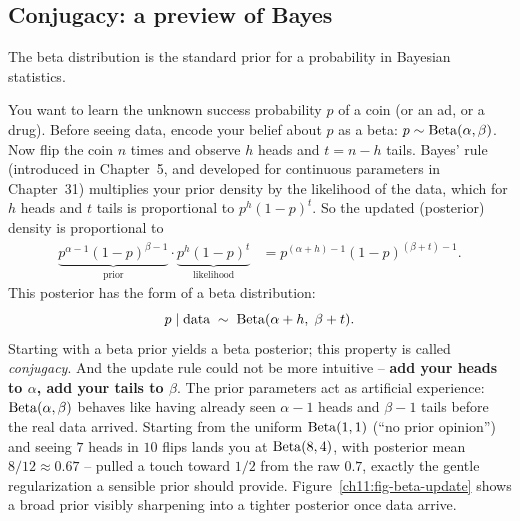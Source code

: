 \subsection{Conjugacy: a preview of Bayes}
\label{ch11:conjugacy}
The beta distribution is the standard prior for a probability in Bayesian statistics.
\begin{applicationbox}
You want to learn the unknown success probability $p$ of a coin (or an ad, or a
drug). Before seeing data, encode your belief about $p$ as a beta:
$p \sim \operatorname{Beta}(\alpha,\beta)$. Now flip the coin $n$ times and observe $h$ heads
and $t = n-h$ tails. Bayes' rule (introduced in Chapter~5, and developed for
continuous parameters in Chapter~31) multiplies your prior
density by the likelihood of the data, which for $h$ heads and $t$ tails is
proportional to $p^{h}(1-p)^{t}$. So the updated (posterior) density is
proportional to
\begin{align*}
  \underbrace{p^{\alpha-1}(1-p)^{\beta-1}}_{\text{prior}} \cdot \underbrace{p^{h}(1-p)^{t}}_{\text{likelihood}} &= p^{(\alpha+h)-1}(1-p)^{(\beta+t)-1}.
\end{align*}
This posterior has the form of a beta distribution:
\[
  p \mid \text{data} \;\sim\; \operatorname{Beta}(\alpha + h,\; \beta + t).
\]
Starting with a beta prior yields a beta posterior; this property is called \emph{conjugacy}. And the update rule
could not be more intuitive -- \textbf{add your heads to $\alpha$, add your tails
to $\beta$}. The prior parameters act as artificial experience: $\operatorname{Beta}(\alpha,
\beta)$ behaves like having already seen $\alpha-1$ heads and $\beta-1$ tails
before the real data arrived. Starting from the uniform $\operatorname{Beta}(1,1)$ (``no prior
opinion'') and seeing $7$ heads in $10$ flips lands you at $\operatorname{Beta}(8,4)$, with
posterior mean $8/12 \approx 0.67$ -- pulled a touch toward $1/2$ from the raw
$0.7$, exactly the gentle regularization a sensible prior should provide.
Figure~\ref{ch11:fig-beta-update} shows a broad prior visibly sharpening into a
tighter posterior once data arrive.
\end{applicationbox}

